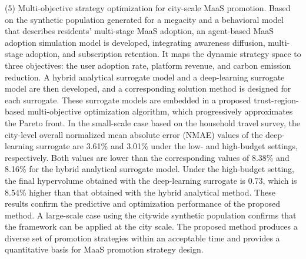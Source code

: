 \begin{englishabstract}
(5) Multi-objective strategy optimization for city-scale MaaS promotion. Based on the synthetic population generated for a megacity and a behavioral model that describes residents' multi-stage MaaS adoption, an agent-based MaaS adoption simulation model is developed, integrating awareness diffusion, multi-stage adoption, and subscription retention. It maps the dynamic strategy space to three objectives: the user adoption rate, platform revenue, and carbon emission reduction. A hybrid analytical surrogate model and a deep-learning surrogate model are then developed, and a corresponding solution method is designed for each surrogate. These surrogate models are embedded in a proposed trust-region-based multi-objective optimization algorithm, which progressively approximates the Pareto front. In the small-scale case based on the household travel survey, the city-level overall normalized mean absolute error (NMAE) values of the deep-learning surrogate are 3.61\% and 3.01\% under the low- and high-budget settings, respectively. Both values are lower than the corresponding values of 8.38\% and 8.16\% for the hybrid analytical surrogate model. Under the high-budget setting, the final hypervolume obtained with the deep-learning surrogate is 0.73, which is 8.54\% higher than that obtained with the hybrid analytical method. These results confirm the predictive and optimization performance of the proposed method. A large-scale case using the citywide synthetic population confirms that the framework can be applied at the city scale. The proposed method produces a diverse set of promotion strategies within an acceptable time and provides a quantitative basis for MaaS promotion strategy design.

	\noindent{}
\end{englishabstract}

